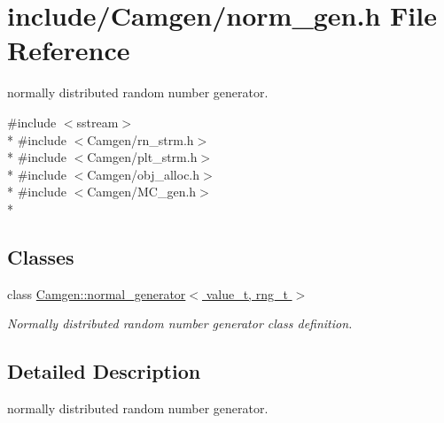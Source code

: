 \hypertarget{a00701}{}\section{include/\+Camgen/norm\+\_\+gen.h File Reference}
\label{a00701}


normally distributed random number generator.  


{\ttfamily \#include $<$sstream$>$}\\*
{\ttfamily \#include $<$Camgen/rn\+\_\+strm.\+h$>$}\\*
{\ttfamily \#include $<$Camgen/plt\+\_\+strm.\+h$>$}\\*
{\ttfamily \#include $<$Camgen/obj\+\_\+alloc.\+h$>$}\\*
{\ttfamily \#include $<$Camgen/\+M\+C\+\_\+gen.\+h$>$}\\*
\subsection*{Classes}
\begin{DoxyCompactItemize}
\item 
class \hyperlink{a00385}{Camgen\+::normal\+\_\+generator$<$ value\+\_\+t, rng\+\_\+t $>$}
\begin{DoxyCompactList}\small\item\em Normally distributed random number generator class definition. \end{DoxyCompactList}\end{DoxyCompactItemize}


\subsection{Detailed Description}
normally distributed random number generator. 

